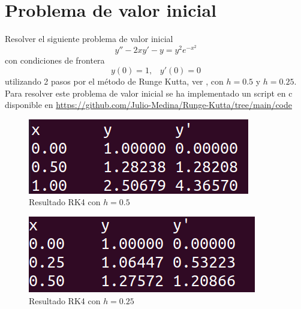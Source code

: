 \documentclass[a4paper]{article}
\begin{document}
\section{Problema de valor inicial}
Resolver el siguiente problema de valor inicial
\begin{equation}
y''-2xy'-y=y^2 e^{-x^2}
\end{equation}
con condiciones de frontera
\begin{equation*}
y(0)=1,\,\,\,\,\,y'(0)=0
\end{equation*}
utilizando 2 pasos por el método de Runge Kutta, ver \cite{Burden}, con $h=0.5$ y $h=0.25$.\\
Para resolver este problema de valor inicial se ha implementado un script en c disponible en \url{https://github.com/Julio-Medina/Runge-Kutta/tree/main/code}\\
\begin{figure}[h]
\begin{center}
\includegraphics[scale=0.4]{./rkh05.png} 
\end{center} 
\caption{Resultado RK4 con $h=0.5$}
\label{plot}
\end{figure}
\begin{figure}[h]
\begin{center}
\includegraphics[scale=0.4]{./rkh025.png} 
\end{center} 
\caption{Resultado RK4 con $h=0.25$}
\label{plot}
\end{figure}
\end{document}
